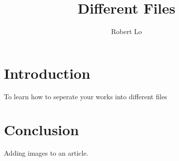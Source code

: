 \documentclass{article}
\title{Different Files}
\author{Robert Lo}
\date{}
\begin{document}
    \maketitle
    
    \section{Introduction}
    
    To learn how to seperate your works into different files

        
        
    
    \section{Conclusion}
    
    Adding images to an article.
    
    
\end{document}
